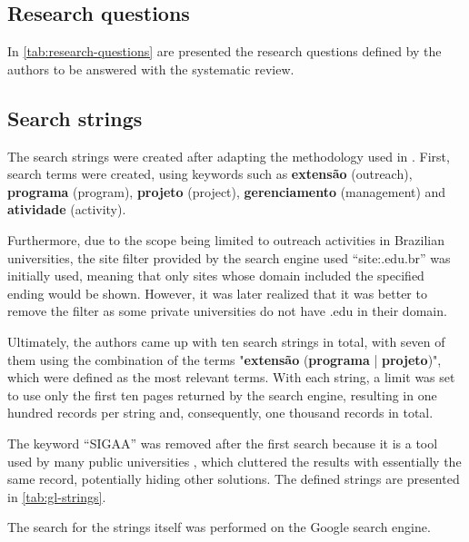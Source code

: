 

\subsection{Research questions}\label{sec:gl-planning-rq}

In \autoref{tab:research-questions} are presented the research questions defined by the authors to be answered with the systematic review.



\subsection{Search strings}\label{sec:gl-planning-strings}

The search strings were created after adapting the methodology used in \cite{godin2015applying}. First, search terms were created, using keywords such as \textbf{extensão} (outreach), \textbf{programa} (program), \textbf{projeto} (project), \textbf{gerenciamento} (management) and \textbf{atividade} (activity).

Furthermore, due to the scope being limited to outreach activities in Brazilian universities, the site filter provided by the search engine used ``site:.edu.br'' was initially used, meaning that only sites whose domain included the specified ending would be shown. However, it was later realized that it was better to remove the filter as some private universities do not have .edu in their domain.

Ultimately, the authors came up with ten search strings in total, with seven of them using the combination of the terms "\textbf{extensão} (\textbf{programa} | \textbf{projeto})", which were defined as the most relevant terms. With each string, a limit was set to use only the first ten pages returned by the search engine, resulting in one hundred records per string and, consequently, one thousand records in total.

The keyword ``\acs{SIGAA}'' was removed after the first search because it is a tool used by many public universities \cite{das2013sistema}, which cluttered the results with essentially the same record, potentially hiding other solutions. The defined strings are presented in \autoref{tab:gl-strings}.



The search for the strings itself was performed on the Google search engine.

